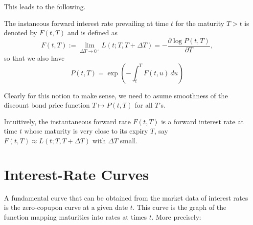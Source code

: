 This leads to the following.

\begin{defn}
The instaneous forward interest rate prevailing at time $t$ for the maturity $T>t$ is denoted by $F(t,T)$ and is defined as
\begin{equation}
F(t,T):= \displaystyle \lim_{\Delta T\to 0^+} L(t; T, T+\Delta T) = -\frac{\partial \log P(t,T)}{\partial T},
\end{equation}
so that we also have 
\begin{equation}
\label{eq:ZBfunctioninstaFR}
P(t,T)=\exp \left(-\int^T_t F(t,u) \, du \right)
\end{equation}
\end{defn}
Clearly for this notion to make sense, we need to asume smoothness of
the discount bond price function $T \mapsto P(t,T)$ for all $T$'s. 

Intuitively, the instantaneous forward rate $F(t,T)$ is a forward
interest rate at time $t$ whose maturity is very close to its expiry
$T$, say $F(t,T) \approx L(t; T, T+\Delta T)$ with $\Delta T$ small.

\section{Interest-Rate Curves}
A fundamental curve that can be obtained from the market data of
interest rates is the zero-copupon curve at a given date $t$. This
curve is the graph of the function mapping maturities into rates at
times $t$. More precisely:

